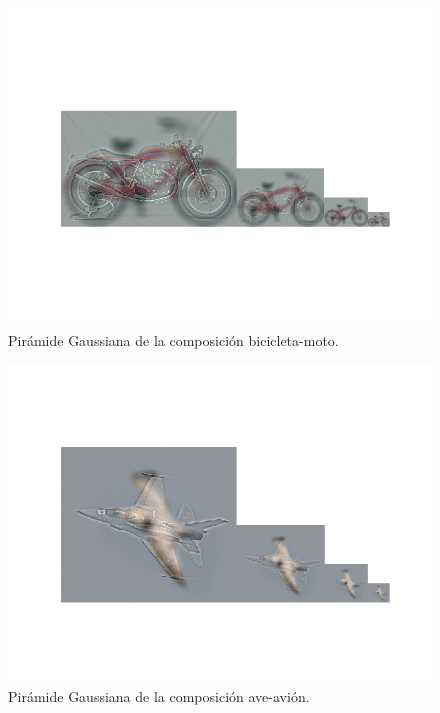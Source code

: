 \documentclass[11pt,a4paper]{article}
\begin{document}
\begin{figure}[H]
\centering
\includegraphics[scale=0.7]{img/c-hyb-pyr3.png}
\caption{Pirámide Gaussiana de la composición bicicleta-moto.}
\label{fig:c-hyb-pyr3}
\end{figure}

\begin{figure}[H]
\centering
\includegraphics[scale=0.7]{img/c-hyb-pyr4.png}
\caption{Pirámide Gaussiana de la composición ave-avión.}
\label{fig:c-hyb-pyr4}
\end{figure}
\end{document}
